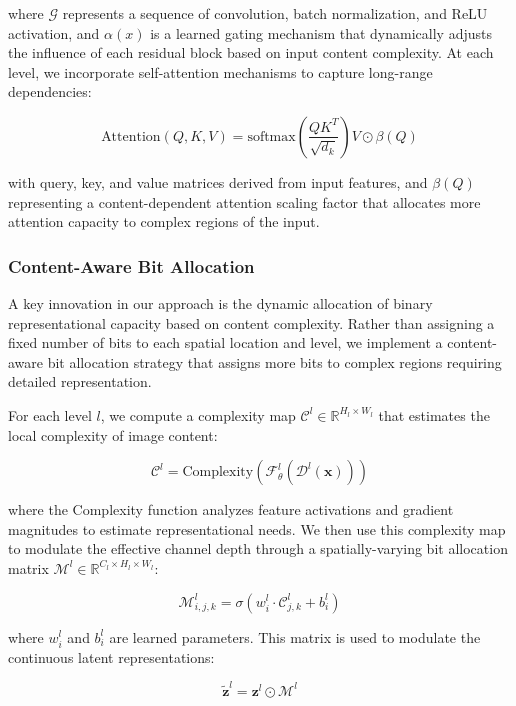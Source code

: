 \documentclass[10pt,twocolumn,letterpaper]{article}
\newcommand{\bm}[1]{\boldsymbol{#1}}
\newcommand{\latent}{\bm{z}}
\newcommand{\img}{\bm{x}}
\newcommand{\R}{\mathbb{R}}
\begin{document}
where $\mathcal{G}$ represents a sequence of convolution, batch normalization, and ReLU activation, and $\alpha(x)$ is a learned gating mechanism that dynamically adjusts the influence of each residual block based on input content complexity. At each level, we incorporate self-attention mechanisms to capture long-range dependencies:

\begin{equation}
\text{Attention}(Q, K, V) = \text{softmax}\left(\frac{QK^T}{\sqrt{d_k}}\right)V \odot \beta(Q)
\end{equation}

with query, key, and value matrices derived from input features, and $\beta(Q)$ representing a content-dependent attention scaling factor that allocates more attention capacity to complex regions of the input.

\subsubsection{Content-Aware Bit Allocation}
A key innovation in our approach is the dynamic allocation of binary representational capacity based on content complexity. Rather than assigning a fixed number of bits to each spatial location and level, we implement a content-aware bit allocation strategy that assigns more bits to complex regions requiring detailed representation.

For each level $l$, we compute a complexity map $\mathcal{C}^l \in \R^{H_l \times W_l}$ that estimates the local complexity of image content:

\begin{equation}
\mathcal{C}^l = \text{Complexity}(\mathcal{F}^l_{\theta}(\mathcal{D}^l(\img)))
\end{equation}

where the Complexity function analyzes feature activations and gradient magnitudes to estimate representational needs. We then use this complexity map to modulate the effective channel depth through a spatially-varying bit allocation matrix $\mathcal{M}^l \in \R^{C_l \times H_l \times W_l}$:

\begin{equation}
\mathcal{M}^l_{i,j,k} = \sigma(w^l_i \cdot \mathcal{C}^l_{j,k} + b^l_i)
\end{equation}

where $w^l_i$ and $b^l_i$ are learned parameters. This matrix is used to modulate the continuous latent representations:

\begin{equation}
\tilde{\latent}^l = \latent^l \odot \mathcal{M}^l
\end{equation}
\end{document}
